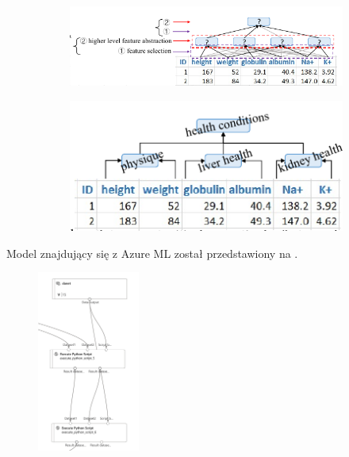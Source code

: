 \begin{figure}[H]
    \hfill
    \begin{subfigure}[m]{\textwidth}
        \centering
        \includegraphics[width=\textwidth]{images/danet_1}
    \end{subfigure}
    \hfill
    \begin{subfigure}[m]{\textwidth}
        \centering
        \includegraphics[width=\textwidth]{images/danet_2}
    \end{subfigure}
    \label{fig:danet-abst}
\end{figure}

Model znajdujący się z Azure ML został przedstawiony na .

\begin{figure}[H]
    \centering
    \includegraphics[width=0.3\textwidth]{images/danet}
    \label{fig:danet-pipe}
\end{figure}


